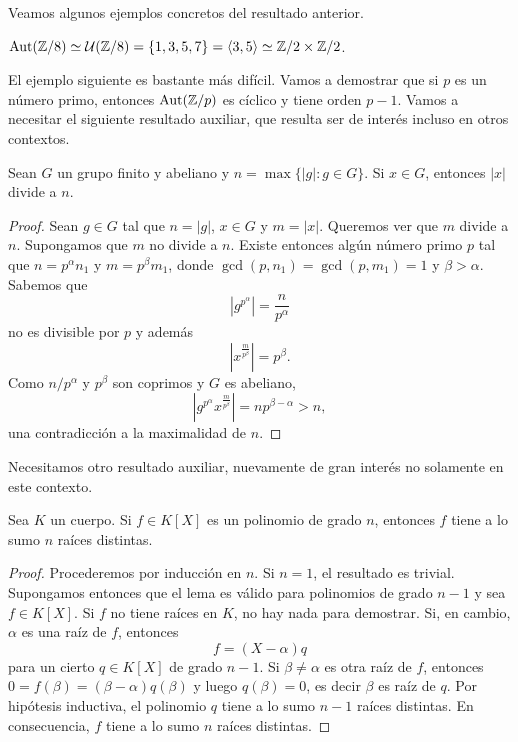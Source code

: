 Veamos algunos ejemplos concretos del resultado anterior. 

\begin{example}
$\operatorname{Aut}(\mathbb{Z}/8)\simeq\mathcal{U}(\mathbb{Z}/8)=\{1,3,5,7\}=\langle 3,5\rangle\simeq\mathbb{Z}/2\times\mathbb{Z}/2$.
\end{example}

El ejemplo siguiente es bastante más difícil. Vamos a demostrar que si $p$ es un número primo, entonces
$\operatorname{Aut}(\mathbb{Z}/p)$ es cíclico y tiene orden $p-1$. Vamos a necesitar el siguiente resultado auxiliar, que resulta ser de interés incluso en otros contextos.  

\begin{lemma}
Sean $G$ un grupo finito y abeliano y $n=\max\{|g|:g\in G\}$. Si $x\in G$, entonces $|x|$ divide a $n$. 
\end{lemma}

\begin{proof}
Sean $g\in G$ tal que $n=|g|$, $x\in G$ y $m=|x|$. Queremos ver que $m$ divide a $n$. Supongamos que $m$ no divide a $n$. Existe entonces algún número primo $p$ 
tal que $n=p^\alpha n_1$ y $m=p^\beta m_1$, donde $\gcd(p,n_1)=\gcd(p,m_1)=1$ y $\beta>\alpha$. Sabemos que
\[
|g^	{p^\alpha}|=\frac{n}{p^\alpha}
\]
no es divisible por $p$ y además
\[
|x^{\frac{m}{p^\beta}}|=p^\beta.
\]
Como $n/p^\alpha$ y $p^\beta$ son coprimos y $G$ es abeliano, 
\[
|g^{p^\alpha}x^{\frac{m}{p^\beta}}|=np^{\beta-\alpha}>n,
\]
una contradicción a la maximalidad de $n$. 
\end{proof}

Necesitamos otro resultado auxiliar, nuevamente de gran interés no solamente en este contexto. 

\begin{lemma}
\label{lem:X^n-1}
Sea $K$ un cuerpo. Si $f\in K[X]$ es un polinomio de grado $n$, entonces $f$ tiene a lo sumo $n$ raíces distintas.
\end{lemma}

\begin{proof}
Procederemos por inducción en $n$. Si $n=1$, el resultado es trivial. Supongamos entonces que el lema es válido para polinomios de grado $n-1$ y sea $f\in K[X]$. Si $f$ no tiene raíces en $K$, no hay nada para demostrar. Si, en cambio, $\alpha$ es una raíz de $f$, entonces
\[
f=(X-\alpha)q
\]
para un cierto $q\in K[X]$ de grado $n-1$. Si $\beta\ne\alpha$ es otra raíz de $f$, entonces $0=f(\beta)=(\beta-\alpha)q(\beta)$ y luego $q(\beta)=0$, es decir $\beta$ es raíz de $q$. Por hipótesis inductiva, el polinomio $q$ tiene a lo sumo $n-1$ raíces distintas. En consecuencia, $f$ tiene a lo sumo $n$ raíces distintas.   
\end{proof}

